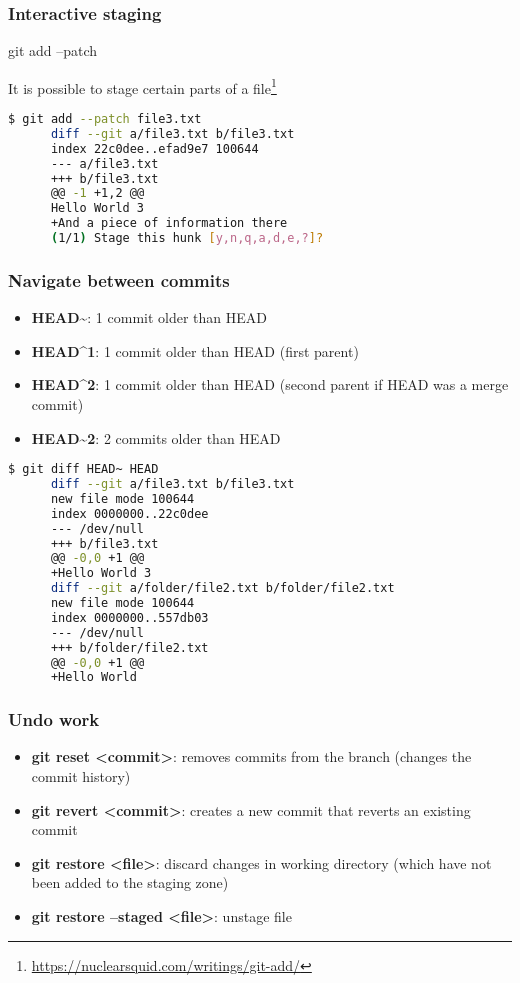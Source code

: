 \begin{frame}[fragile]\frametitle{Interactive staging}
   \begin{center}
      \Huge git add --patch\normalsize
   \end{center}
   \vspace{1em}
   It is possible to stage certain parts of a file\footnote{\url{https://nuclearsquid.com/writings/git-add/}}
   \vspace{1em}
   \begin{lstlisting}[language=bash, style=bash, autogobble]
      $ git add --patch file3.txt
      diff --git a/file3.txt b/file3.txt
      index 22c0dee..efad9e7 100644
      --- a/file3.txt
      +++ b/file3.txt
      @@ -1 +1,2 @@
      Hello World 3
      +And a piece of information there
      (1/1) Stage this hunk [y,n,q,a,d,e,?]?
   \end{lstlisting}
\end{frame}

\begin{frame}[fragile]\frametitle{Navigate between commits}
   \begin{itemize}
      \item \textbf{HEAD\~{}}: 1 commit older than HEAD
      \item \textbf{HEAD\^{}1}: 1 commit older than HEAD (first parent)
      \item \textbf{HEAD\^{}2}: 1 commit older than HEAD (second parent if HEAD was a merge commit)
      \item \textbf{HEAD\~{}2}: 2 commits older than HEAD
   \end{itemize}
   \vspace{1em}
   \begin{lstlisting}[language=bash, style=bash, autogobble]
      $ git diff HEAD~ HEAD
      diff --git a/file3.txt b/file3.txt
      new file mode 100644
      index 0000000..22c0dee
      --- /dev/null
      +++ b/file3.txt
      @@ -0,0 +1 @@
      +Hello World 3
      diff --git a/folder/file2.txt b/folder/file2.txt
      new file mode 100644
      index 0000000..557db03
      --- /dev/null
      +++ b/folder/file2.txt
      @@ -0,0 +1 @@
      +Hello World
   \end{lstlisting}
\end{frame}

\begin{frame}\frametitle{Undo work}
   \begin{itemize}
      \item \textbf{git reset <commit>}: removes commits from the branch (changes the commit history)
      \item \textbf{git revert <commit>}: creates a new commit that reverts an existing commit
      \item \textbf{git restore <file>}: discard changes in working directory (which have not been added to the staging zone)
      \item \textbf{git restore --staged <file>}: unstage file
   \end{itemize}
\end{frame}

